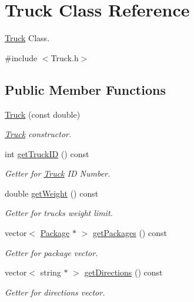 \hypertarget{classTruck}{}\section{Truck Class Reference}
\label{classTruck}


\hyperlink{classTruck}{Truck} Class.  




{\ttfamily \#include $<$Truck.\+h$>$}

\subsection*{Public Member Functions}
\begin{DoxyCompactItemize}
\item 
\hyperlink{classTruck_a139a26bbf66738685b66a5747bffdc2c}{Truck} (const double)
\begin{DoxyCompactList}\small\item\em \hyperlink{classTruck}{Truck} constructor. \end{DoxyCompactList}\item 
int \hyperlink{classTruck_ac6d9654486fdae70caaecad8ff6ec561}{get\+Truck\+ID} () const 
\begin{DoxyCompactList}\small\item\em Getter for \hyperlink{classTruck}{Truck} ID Number. \end{DoxyCompactList}\item 
double \hyperlink{classTruck_ab4e29138dc4a6c430f0b365180cac978}{get\+Weight} () const 
\begin{DoxyCompactList}\small\item\em Getter for truck\textquotesingle{}s weight limit. \end{DoxyCompactList}\item 
vector$<$ \hyperlink{classPackage}{Package} $\ast$ $>$ \hyperlink{classTruck_a6448f8b9d6cfaaaf5e2bc21b9e103685}{get\+Packages} () const 
\begin{DoxyCompactList}\small\item\em Getter for package vector. \end{DoxyCompactList}\item 
vector$<$ string $\ast$ $>$ \hyperlink{classTruck_a80092b55170e601b68dd2cd184933079}{get\+Directions} () const 
\begin{DoxyCompactList}\small\item\em Getter for directions vector. \end{DoxyCompactList}\item 

\end{DoxyCompactItemize}
